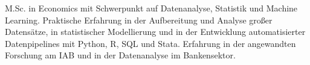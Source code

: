 M.Sc. in Economics mit Schwerpunkt auf Datenanalyse, Statistik und Machine Learning. Praktische Erfahrung in der Aufbereitung und Analyse großer Datensätze, in statistischer Modellierung und in der Entwicklung automatisierter Datenpipelines mit Python, R, SQL und Stata. Erfahrung in der angewandten Forschung am IAB und in der Datenanalyse im Bankensektor.
